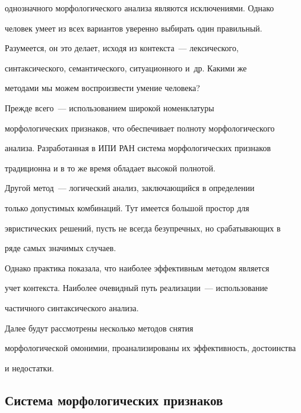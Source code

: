 однозначного морфологического анализа являются исключениями. Однако 


человек  умеет из всех вариантов уверенно выбирать один правильный. 


Разумеется, он это делает, исходя из контекста~--- лексического, 


синтаксического, семантического, ситуационного и~др. Какими же 


методами мы можем воспроизвести умение человека?


   


   Прежде всего~--- использованием широкой номенклатуры 


морфологических признаков, что обеспечивает полноту морфологического 


анализа. Разработанная в ИПИ РАН система морфологических признаков 


традиционна и в то же время обладает высокой полнотой.  


   


   Другой метод~--- логический анализ, заключающийся в определении 


только допустимых комбинаций. Тут имеется большой простор для 


эвристических решений, пусть не всегда безупречных, но срабатывающих в 


ряде самых значимых случаев.


   


   Однако практика показала, что наиболее эффективным методом является 


учет контекста. Наиболее очевидный путь реализации~--- использование 


частичного синтаксического анализа. 


   


   Далее будут рассмотрены несколько методов снятия 


морфологической омонимии, проанализированы их эффективность, достоинства 


и недостатки.





   \vspace*{-2pt}


   


   \subsection{Система морфологических признаков }


